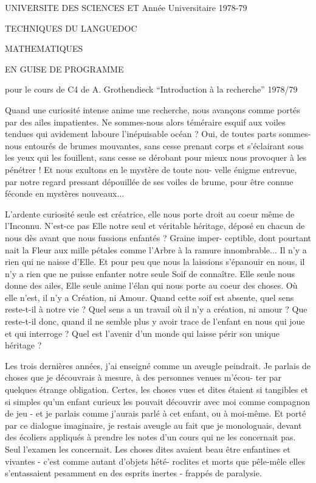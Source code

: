 \documentclass[11pt]{article}
\newcommand{\scanpage}[1]{\par\bigskip\noindent{\small\sffamily[scan #1]}\par}
\begin{document}
\clearpage
\scanpage{119/193}
UNIVERSITE DES SCIENCES ET \hfill Année Universitaire 1978-79

TECHNIQUES DU LANGUEDOC

MATHEMATIQUES

EN GUISE DE PROGRAMME

pour le cours de C4 de A. Grothendieck ``Introduction à la recherche'' 1978/79

Quand une curiosité intense anime une recherche, nous avançons comme
portés par des ailes impatientes. Ne sommes-nous alors téméraire esquif aux
voiles tendues qui avidement laboure l'inépuisable océan ? Oui, de toutes
parts sommes-nous entourés de brumes mouvantes, sans cesse prenant corps et
s'éclairant sous les yeux qui les fouillent, sans cesse se dérobant pour mieux
nous provoquer à les pénétrer ! Et nous exultons en le mystère de toute nou-%
velle énigme entrevue, par notre regard pressant dépouillée de ses voiles de
brume, pour être connue féconde en mystères nouveaux...

L'ardente curiosité seule est créatrice, elle nous porte droit au
coeur même de l'Inconnu. N'est-ce pas Elle notre seul et véritable héritage,
déposé en chacun de nous dès avant que nous fussions enfantés ? Graine imper-%
ceptible, dont pourtant nait la Fleur aux mille pétales comme l'Arbre à la
ramure innombrable... Il n'y a rien qui ne naisse d'Elle. Et pour peu que nous
la laissions s'épanouir en nous, il n'y a rien que ne puisse enfanter notre
seule Soif de connaître. Elle seule nous donne des ailes, Elle seule anime
l'élan qui nous porte au coeur des choses. Où elle n'est, il n'y a Création,
ni Amour.
Quand cette soif est absente, quel sens reste-t-il à notre vie ?
Quel sens a un travail où il n'y a création, ni amour ? Que reste-t-il donc,
quand il ne semble plus y avoir trace de l'enfant en nous qui joue et qui
interroge ? Quel est l'avenir d'un monde qui laisse périr son unique héritage ?

Les trois dernières années, j'ai enseigné comme un aveugle peindrait.
Je parlais de choses que je découvrais à mesure, à des personnes venues m'écou-%
ter par quelques étrange obligation. Certes, les choses vues et dites étaient
si tangibles et si simples qu'un enfant curieux les pouvait découvrir avec moi
comme compagnon de jeu - et je parlais comme j'aurais parlé à cet enfant, ou
à moi-même. Et porté par ce dialogue imaginaire, je restais aveugle au fait que
je monologuais, devant des écoliers appliqués à prendre les notes d'un cours
qui ne les concernait pas. Seul l'examen les concernait. Les choses dites
avaient beau être enfantines et vivantes - c'est comme autant d'objets hété-%
roclites et morts que pêle-mêle elles s'entassaient pesamment en des esprits
inertes - frappés de paralysie.
\end{document}
